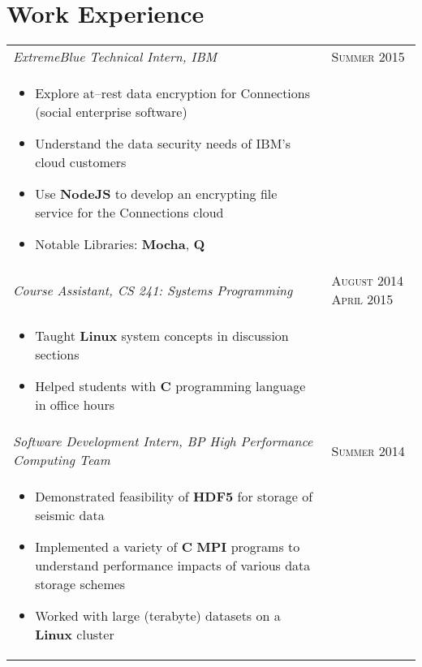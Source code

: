 \documentclass[letterpaper,10pt]{article}
\begin{document}
\section{Work Experience}
\begin{tabular}{p{12.8cm}>{\raggedleft\arraybackslash}p{3cm}}

    \emph{ExtremeBlue Technical Intern, IBM} & \textsc{Summer 2015} \\

    \vspace{-2mm}
    \begin{itemize}
        \item
            Explore at--rest data encryption for Connections (social
            enterprise software)
        \item
            Understand the data security needs of IBM's cloud customers
        \item
            Use \textbf{NodeJS} to develop an encrypting file service for the
            Connections cloud
        \item
            Notable Libraries: \textbf{Mocha}, \textbf{Q}
    \end{itemize} \\

    \emph{Course Assistant, CS 241: Systems Programming} &
    \textsc{August 2014 April 2015} \\

    \vspace{-6mm}
    \begin{itemize}
        \item
            Taught \textbf{Linux} system concepts in discussion sections
        \item
            Helped students with \textbf{C} programming language in office hours
    \end{itemize} \\

    \emph{Software Development Intern, BP High Performance Computing Team} &
    \textsc{Summer 2014} \\

    \vspace{-2mm}
    \begin{itemize}
        \item
            Demonstrated feasibility of \textbf{HDF5} for storage of seismic
            data
        \item
            Implemented a variety of \textbf{C} \textbf{MPI} programs to
            understand performance impacts of various data storage schemes
        \item
            Worked with large (terabyte) datasets on a \textbf{Linux} cluster


\end{itemize}
\end{tabular}
\end{document}
